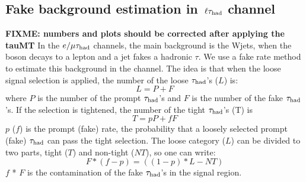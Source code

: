 \subsection{\texorpdfstring{Fake background estimation in $\,\ell\tau_{\rm had}$ channel}{Fake background estimation in lepton-tau channel}}
\label{sect:bkgLeptau}
{\bf FIXME: numbers and plots should be corrected after applying the tauMT}
In the $e/\mu\tau_{\rm had}$ channels, the main background is the Wjets, when the \Wpm boson decays to a lepton and a jet fakes a hadronic $\tau$.
We use a fake rate method to estimate this background \cite{CMS_AN_2010-261} in the \muTau channel.
The idea is that when the loose signal selection is applied, the number of the loose $\tau_{\rm had}$'s ($L$) is:
\begin{equation}
L = P + F
\end{equation}
where $P$ is the number of the  prompt $\tau_{\rm had}$'s and $F$ is the number of the  fake $\tau_{\rm had}$'s. If the selection is tightened, the number of the tight $\tau_{\rm had}$'s (T) is
\begin{equation}
 T = pP + fF
\end{equation} 
$p$ ($f$) is the prompt (fake) rate, the probability that a loosely selected prompt (fake) $\tau_{\rm had}$ can pass the  tight  selection. The loose category ($L$) can be divided to two parts, 
tight ($T$) and non-tight ($NT$), so one can write:
\begin{equation}
   F * (f - p) = ((1 - p) * L - NT)
\end{equation}
$f$ * $F$ is the contamination of the fake $\tau_{\rm had}$'s in the signal region. 

